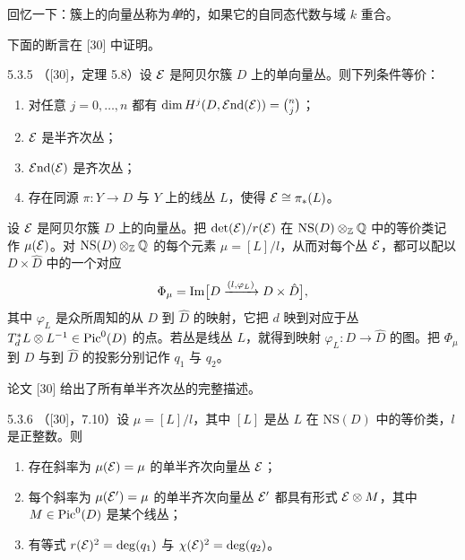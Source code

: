 
回忆一下：簇上的向量丛称为\emph{单}的，如果它的自同态代数与域 $k$ 重合。

下面的断言在 [30] 中证明。

\begin{proposition}{5.3.5}
（[30]，定理 5.8）设 $\mathcal{E}$ 是阿贝尔簇 $D$ 上的单向量丛。则下列条件等价：
\begin{enumerate}[label=(\arabic*),leftmargin=2.8em,itemsep=2pt,topsep=2pt]
\item 对任意 $j=0,\dots,n$ 都有 $\dim H^j(D,\mathcal{E}\mathrm{nd}(\mathcal{E}))=\binom{n}{j}$；
\item $\mathcal{E}$ 是半齐次丛；
\item $\mathcal{E}\mathrm{nd}(\mathcal{E})$ 是齐次丛；
\item 存在同源 $\pi:Y\to D$ 与 $Y$ 上的线丛 $L$，使得 $\mathcal{E}\cong\pi_*(L)$。
\end{enumerate}
\end{proposition}

设 $\mathcal{E}$ 是阿贝尔簇 $D$ 上的向量丛。把 $\det(\mathcal{E})/r(\mathcal{E})$ 在 $\mathrm{NS}(D)\otimes_{\mathbb{Z}}\mathbb{Q}$ 中的等价类记作 $\mu(\mathcal{E})$。对 $\mathrm{NS}(D)\otimes_{\mathbb{Z}}\mathbb{Q}$ 的每个元素 $\mu=[L]/l$，从而对每个丛 $\mathcal{E}$，都可以配以 $D\times\hat D$ 中的一个对应
\begin{equation*}
\Phi_\mu=\operatorname{Im}\bigl[D\xrightarrow{(l,\varphi_L)}D\times\hat D\bigr],
\end{equation*}
其中 $\varphi_L$ 是众所周知的从 $D$ 到 $\hat D$ 的映射，它把 $d$ 映到对应于丛 $T_d^*L\otimes L^{-1}\in\operatorname{Pic}^0(D)$ 的点。若丛是线丛 $L$，就得到映射 $\varphi_L:D\to\hat D$ 的图。把 $\Phi_\mu$ 到 $D$ 与到 $\hat D$ 的投影分别记作 $q_1$ 与 $q_2$。

论文 [30] 给出了所有单半齐次丛的完整描述。

\begin{proposition}{5.3.6}
（[30]，7.10）设 $\mu=[L]/l$，其中 $[L]$ 是丛 $L$ 在 $\mathrm{NS}(D)$ 中的等价类，$l$ 是正整数。则
\begin{enumerate}[label=(\arabic*),leftmargin=2.8em,itemsep=2pt,topsep=2pt]
\item 存在斜率为 $\mu(\mathcal{E})=\mu$ 的单半齐次向量丛 $\mathcal{E}$；
\item 每个斜率为 $\mu(\mathcal{E}')=\mu$ 的单半齐次向量丛 $\mathcal{E}'$ 都具有形式 $\mathcal{E}\otimes M$，其中 $M\in\operatorname{Pic}^0(D)$ 是某个线丛；
\item 有等式 $r(\mathcal{E})^2=\deg(q_1)$ 与 $\chi(\mathcal{E})^2=\deg(q_2)$。
\end{enumerate}
\end{proposition}

